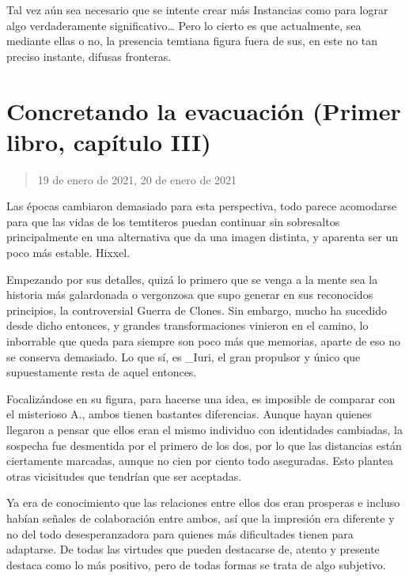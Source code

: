 \documentclass[
]{book}
\begin{document}
Tal vez aún sea necesario que se intente crear más Instancias como para lograr algo verdaderamente significativo\ldots{} Pero lo cierto es que actualmente, sea mediante ellas o no, la presencia temtiana figura fuera de sus, en este no tan preciso instante, difusas fronteras.

\hypertarget{concretando-la-evacuaciuxf3n-primer-libro-capuxedtulo-iii}{%
\section{Concretando la evacuación (Primer libro, capítulo III)}\label{concretando-la-evacuaciuxf3n-primer-libro-capuxedtulo-iii}}

\begin{quote}
19 de enero de 2021, 20 de enero de 2021
\end{quote}

Las épocas cambiaron demasiado para esta perspectiva, todo parece acomodarse para que las vidas de los temtiteros puedan continuar sin sobresaltos principalmente en una alternativa que da una imagen distinta, y aparenta ser un poco más estable. Hixxel.

Empezando por sus detalles, quizá lo primero que se venga a la mente sea la historia más galardonada o vergonzosa que supo generar en sus reconocidos principios, la controversial Guerra de Clones. Sin embargo, mucho ha sucedido desde dicho entonces, y grandes transformaciones vinieron en el camino, lo inborrable que queda para siempre son poco más que memorias, aparte de eso no se conserva demasiado. Lo que sí, es \_Iuri, el gran propulsor y único que supuestamente resta de aquel entonces.

Focalizándose en su figura, para hacerse una idea, es imposible de comparar con el misterioso A., ambos tienen bastantes diferencias. Aunque hayan quienes llegaron a pensar que ellos eran el mismo individuo con identidades cambiadas, la sospecha fue desmentida por el primero de los dos, por lo que las distancias están ciertamente marcadas, aunque no cien por ciento todo aseguradas. Esto plantea otras vicisitudes que tendrían que ser aceptadas.

Ya era de conocimiento que las relaciones entre ellos dos eran prosperas e incluso habían señales de colaboración entre ambos, así que la impresión era diferente y no del todo desesperanzadora para quienes más dificultades tienen para adaptarse. De todas las virtudes que pueden destacarse de, atento y presente destaca como lo más positivo, pero de todas formas se trata de algo subjetivo.
\end{document}
